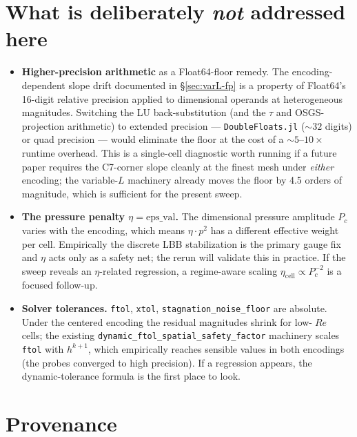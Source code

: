 \documentclass[11pt]{article}
\newcommand{\Reyn}{\operatorname{\mathit{Re}}}
\newcommand{\code}[1]{\texttt{#1}}
\begin{document}
\section{What is deliberately \emph{not} addressed here}

\begin{itemize}
  \item \textbf{Higher-precision arithmetic} as a Float64-floor remedy.
        The encoding-dependent slope drift documented in
        §\ref{sec:varL-fp} is a property of Float64's 16-digit relative
        precision applied to dimensional operands at heterogeneous
        magnitudes. Switching the LU back-substitution (and the
        $\tau$ and OSGS-projection arithmetic) to extended precision
        — \code{DoubleFloats.jl} ($\sim 32$ digits) or quad precision —
        would eliminate the floor at the cost of a $\sim 5$--$10\times$
        runtime overhead. This is a single-cell diagnostic worth
        running if a future paper requires the C7-corner slope cleanly
        at the finest mesh under \emph{either} encoding; the variable-$L$
        machinery already moves the floor by 4.5 orders of magnitude,
        which is sufficient for the present sweep.
  \item \textbf{The pressure penalty $\eta = \mathrm{eps\_val}$.}
        The dimensional pressure amplitude $P_c$ varies with the encoding,
        which means $\eta \cdot p^2$ has a different effective weight per
        cell. Empirically the discrete LBB stabilization is the primary
        gauge fix and $\eta$ acts only as a safety net; the rerun will
        validate this in practice. If the sweep reveals an $\eta$-related
        regression, a regime-aware scaling
        $\eta_{\mathrm{cell}} \propto P_c^{-2}$ is a focused follow-up.
  \item \textbf{Solver tolerances.}
        \texttt{ftol}, \texttt{xtol}, \texttt{stagnation\_noise\_floor}
        are absolute. Under the centered encoding the residual magnitudes
        shrink for low-$\Reyn$ cells; the existing
        \texttt{dynamic\_ftol\_spatial\_safety\_factor} machinery scales
        \texttt{ftol} with $h^{k+1}$, which empirically reaches sensible
        values in both encodings (the probes converged to high precision).
        If a regression appears, the dynamic-tolerance formula is the
        first place to look.
\end{itemize}

\section*{Provenance}
\end{document}
